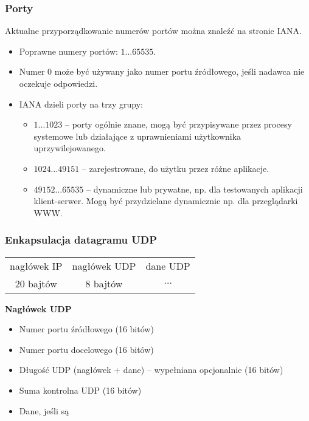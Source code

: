 \documentclass[../main.tex]{subfiles}
\begin{document}
    \subsubsection{Porty}
    Aktualne przyporządkowanie numerów portów można znaleźć na stronie IANA.
    \begin{itemize}
        \item Poprawne numery portów: $1 \dots 65535$.
        \item Numer 0 może być używany jako numer portu źródłowego, jeśli nadawca nie oczekuje odpowiedzi.
        \\
        \item IANA dzieli porty na trzy grupy:
        \begin{itemize}
            \item $1 \dots 1023$ – porty ogólnie znane, mogą być przypisywane przez procesy systemowe lub działające z uprawnieniami użytkownika uprzywilejowanego.
            \item $1024 \dots 49151$ – zarejestrowane, do użytku przez różne aplikacje.
            \item $49152 \dots 65535$ – dynamiczne lub prywatne, np. dla testowanych aplikacji klient-serwer. Mogą być przydzielane dynamicznie np. dla przeglądarki WWW.
        \end{itemize}
    \end{itemize}

    \subsubsection{Enkapsulacja datagramu UDP}

    \begin{tabular}{|c|c|c|}
        \hline
        nagłówek IP & nagłówek UDP & dane UDP\\
        20 bajtów & 8 bajtów & $\dots$\\
        \hline
    \end{tabular}

    \textbf{Nagłówek UDP}
    \begin{itemize}
        \item Numer portu źródłowego (16 bitów)
        \item Numer portu docelowego (16 bitów)
        \item Długość UDP (nagłówek + dane) – wypełniana opcjonalnie (16 bitów)
        \item Suma kontrolna UDP (16 bitów)
        \item Dane, jeśli są
    \end{itemize}
\end{document}
